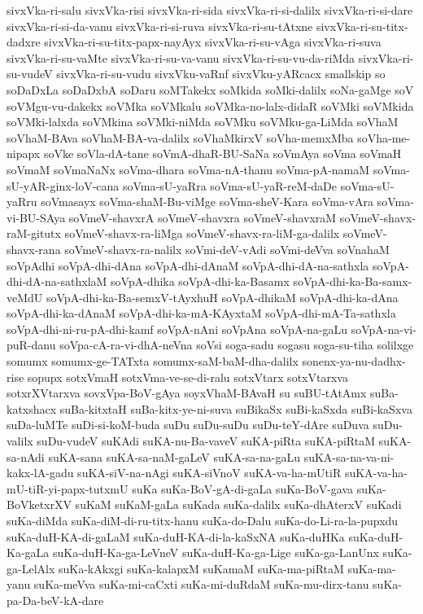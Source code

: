 {sivxVka-ri-salu
sivxVka-risi
sivxVka-ri-sida
sivxVka-ri-si-dalilx
sivxVka-ri-si-dare
sivxVka-ri-si-da-vanu
sivxVka-ri-si-ruva
sivxVka-ri-su-tAtxne
sivxVka-ri-su-titx-dadxre
sivxVka-ri-su-titx-papx-nayAyx
sivxVka-ri-su-vAga
sivxVka-ri-suva
sivxVka-ri-su-vaMte
sivxVka-ri-su-va-vanu
sivxVka-ri-su-vu-da-riMda
sivxVka-ri-su-vudeV
sivxVka-ri-su-vudu
sivxVku-vaRnf
sivxVku-yARcacx
smallskip
so
soDaDxLa
soDaDxbA
soDaru
soMTakekx
soMkida
soMki-dalilx
soNa-gaMge
soV
soVMgu-vu-dakekx
soVMka
soVMkalu
soVMka-no-lalx-didaR
soVMki
soVMkida
soVMki-lalxda
soVMkina
soVMki-niMda
soVMku
soVMku-ga-LiMda
soVhaM
soVhaM-BAva
soVhaM-BA-va-dalilx
soVhaMkirxV
soVha-memxMba
soVha-me-nipapx
soVke
soVla-dA-tane
soVmA-dhaR-BU-SaNa
soVmAya
soVma
soVmaH
soVmaM
soVmaNaNx
soVma-dhara
soVma-nA-thanu
soVma-pA-namaM
soVma-sU-yAR-ginx-loV-cana
soVma-sU-yaRra
soVma-sU-yaR-reM-daDe
soVma-sU-yaRru
soVmasayx
soVma-shaM-Bu-viMge
soVma-sheV-Kara
soVma-vAra
soVma-vi-BU-SAya
soVmeV-shavxrA
soVmeV-shavxra
soVmeV-shavxraM
soVmeV-shavx-raM-gitutx
soVmeV-shavx-ra-liMga
soVmeV-shavx-ra-liM-ga-dalilx
soVmeV-shavx-rana
soVmeV-shavx-ra-nalilx
soVmi-deV-vAdi
soVmi-deVva
soVnahaM
soVpAdhi
soVpA-dhi-dAna
soVpA-dhi-dAnaM
soVpA-dhi-dA-na-sathxla
soVpA-dhi-dA-na-sathxlaM
soVpA-dhika
soVpA-dhi-ka-Basamx
soVpA-dhi-ka-Ba-samx-veMdU
soVpA-dhi-ka-Ba-semxV-tAyxhuH
soVpA-dhikaM
soVpA-dhi-ka-dAna
soVpA-dhi-ka-dAnaM
soVpA-dhi-ka-mA-KAyxtaM
soVpA-dhi-mA-Ta-sathxla
soVpA-dhi-ni-ru-pA-dhi-kamf
soVpA-nAni
soVpAna
soVpA-na-gaLu
soVpA-na-vi-puR-danu
soVpa-cA-ra-vi-dhA-neVna
soVsi
soga-sadu
sogasu
soga-su-tiha
solilxge
somumx
somumx-ge-TATxta
somumx-saM-baM-dha-dalilx
sonenx-ya-nu-dadhx-rise
sopupx
sotxVmaH
sotxVma-ve-se-di-ralu
sotxVtarx
sotxVtarxva
sotxrXVtarxva
sovxVpa-BoV-gAya
soyxVhaM-BAvaH
su
suBU-tAtAmx
suBa-katxshacx
suBa-kitxtaH
suBa-kitx-ye-ni-suva
suBikaSx
suBi-kaSxda
suBi-kaSxva
suDa-luMTe
suDi-si-koM-buda
suDu
suDu-suDu
suDu-teY-dAre
suDuva
suDu-valilx
suDu-vudeV
suKAdi
suKA-nu-Ba-vaveV
suKA-piRta
suKA-piRtaM
suKA-sa-nAdi
suKA-sana
suKA-sa-naM-gaLeV
suKA-sa-na-gaLu
suKA-sa-na-va-ni-kakx-lA-gadu
suKA-siV-na-nAgi
suKA-siVnoV
suKA-va-ha-mUtiR
suKA-va-ha-mU-tiR-yi-papx-tutxmU
suKa
suKa-BoV-gA-di-gaLa
suKa-BoV-gava
suKa-BoVketxrXV
suKaM
suKaM-gaLa
suKada
suKa-dalilx
suKa-dhAterxV
suKadi
suKa-diMda
suKa-diM-di-ru-titx-hanu
suKa-do-Dalu
suKa-do-Li-ra-la-pupxdu
suKa-duH-KA-di-gaLaM
suKa-duH-KA-di-la-kaSxNA
suKa-duHKa
suKa-duH-Ka-gaLa
suKa-duH-Ka-ga-LeVneV
suKa-duH-Ka-ga-Lige
suKa-ga-LanUnx
suKa-ga-LelAlx
suKa-kAkxgi
suKa-kalapxM
suKamaM
suKa-ma-piRtaM
suKa-ma-yanu
suKa-meVva
suKa-mi-caCxti
suKa-mi-duRdaM
suKa-mu-dirx-tanu
suKa-pa-Da-beV-kA-dare
}
